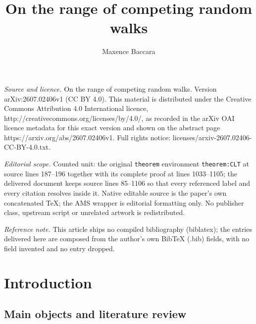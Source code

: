 \documentclass[10pt,a4paper]{amsart}
\newcommand{\1}{\mathds{1}}
\numberwithin{equation}{section}
\begin{document}
\title[On the range of competing random walks]{On the range of competing random walks}
\author{Maxence Baccara}
\date{}
\maketitle
\noindent\emph{Source and licence.} On the range of competing random walks. Version arXiv:2607.02406v1 (CC BY 4.0). This material is distributed under the Creative Commons Attribution 4.0 International licence, http://creativecommons.org/licenses/by/4.0/, as recorded in the arXiv OAI licence metadata for this exact version and shown on the abstract page https://arxiv.org/abs/2607.02406v1. Full rights notice: licenses/arxiv-2607.02406-CC-BY-4.0.txt.\par\smallskip
\noindent\textit{Editorial scope.} Counted unit: the original \texttt{theorem} environment \texttt{theorem:CLT} at source lines 187--196 together with its complete proof at lines 1033--1105; the delivered document keeps source lines 85--1106 so that every referenced label and every citation resolves inside it. Native editable source is the paper's own concatenated TeX; the AMS wrapper is editorial formatting only. No publisher class, upstream script or unrelated artwork is redistributed.
\par\smallskip\noindent\textit{Reference note.} This article ships no compiled bibliography (biblatex); the entries delivered here are composed from the author's own BibTeX (.bib) fields, with no field invented and no entry dropped.
\section{Introduction}

\subsection{Main objects and literature review}
\end{document}
